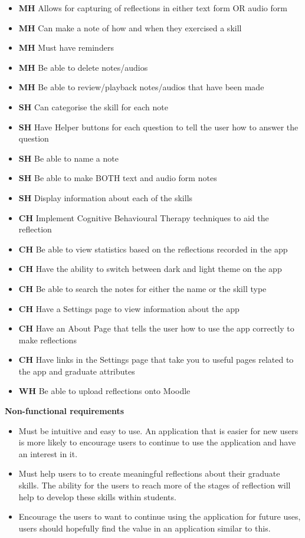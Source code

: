 \documentclass{l4proj}
\begin{document}
\begin{itemize}
    \item \textbf{MH} Allows for capturing of reflections in either text form OR audio form
    \item \textbf{MH} Can make a note of how and when they exercised a skill
    \item \textbf{MH} Must have reminders
    \item \textbf{MH} Be able to delete notes/audios
    \item \textbf{MH} Be able to review/playback notes/audios that have been made
    \item \textbf{SH} Can categorise the skill for each note
    \item \textbf{SH} Have Helper buttons for each question to tell the user how to answer the question
    \item \textbf{SH} Be able to name a note
    \item \textbf{SH} Be able to make BOTH text and audio form notes
    \item \textbf{SH} Display information about each of the skills
    \item \textbf{CH} Implement Cognitive Behavioural Therapy techniques to aid the reflection
    \item \textbf{CH} Be able to view statistics based on the reflections recorded in the app
    \item \textbf{CH} Have the ability to switch between dark and light theme on the app
    \item \textbf{CH} Be able to search the notes for either the name or the skill type
    \item \textbf{CH} Have a Settings page to view information about the app
    \item \textbf{CH} Have an About Page that tells the user how to use the app correctly to make reflections
    \item \textbf{CH} Have links in the Settings page that take you to useful pages related to the app and graduate attributes
    \item \textbf{WH} Be able to upload reflections onto Moodle
\end{itemize}
\par
\textbf{Non-functional requirements}
\begin{itemize}
    \item Must be intuitive and easy to use. An application that is easier for new users is more likely to encourage users to continue
    to use the application and have an interest in it.
    \item Must help users to to create meaningful reflections about their graduate skills. The ability for the users to reach more 
    of the stages of reflection will help to develop these skills within students.
    \item Encourage the users to want to continue using the application for future uses, users should hopefully find the value in an
    application similar to this. 
\end{itemize}
\end{document}
